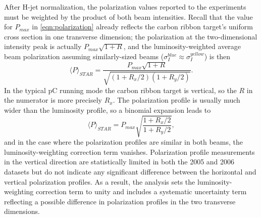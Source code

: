 After H-jet normalization, the polarization values reported to the experiments
must be weighted by the product of both beam intensities. Recall that the
value for \(P_{max}\) in \ref{eqn:polarization} already reflects the carbon
ribbon target's uniform cross section in one transverse dimension; the
polarization at the two-dimensional intensity peak is actually
\(P_{max}\sqrt{1+R}\), and the luminosity-weighted average beam polarization
assuming similarly-sized beams (\(\sigma_I^{blue} \approx \sigma_I^{yellow}\))
is then
%
\begin{equation}
  \langle P \rangle_{STAR} = \frac{P_{max} \sqrt{1+R}}{\sqrt{(1+R_x/2)(1+R_y/2)}}.
\end{equation}
%
In the typical pC running mode the carbon ribbon target is vertical, so the
\(R\) in the numerator is more precisely \(R_x\). The polarization profile is
usually much wider than the luminosity profile, so a binomial expansion leads
to
%
\begin{equation}
  \langle P \rangle_{STAR} = P_{max} \sqrt{\frac{1+R_x/2}{1+R_y/2}},
\end{equation}
and in the case where the polarization profiles are similar in both beams, the
luminosity-weighting correction term vanishes. Polarization profile
measurements in the vertical direction are statistically limited in both the
2005 and 2006 datasets but do not indicate any significant difference between
the horizontal and vertical polarization profiles. As a result, the analysis
sets the luminosity-weighting correction term to unity and includes a
systematic uncertainty term reflecting a possible difference in polarization
profiles in the two transverse dimensions.

